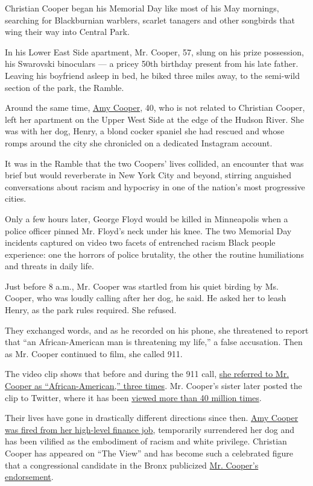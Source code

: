Christian Cooper began his Memorial Day like most of his May mornings,
searching for Blackburnian warblers, scarlet tanagers and other
songbirds that wing their way into Central Park.

In his Lower East Side apartment, Mr. Cooper, 57, slung on his prize
possession, his Swarovski binoculars --- a pricey 50th birthday present
from his late father. Leaving his boyfriend asleep in bed, he biked
three miles away, to the semi-wild section of the park, the Ramble.

Around the same time,
\href{https://www.nytimes3xbfgragh.onion/2020/07/06/nyregion/amy-cooper-false-report-charge.html}{Amy
Cooper}, 40, who is not related to Christian Cooper, left her apartment
on the Upper West Side at the edge of the Hudson River. She was with her
dog, Henry, a blond cocker spaniel she had rescued and whose romps
around the city she chronicled on a dedicated Instagram account.

It was in the Ramble that the two Coopers' lives collided, an encounter
that was brief but would reverberate in New York City and beyond,
stirring anguished conversations about racism and hypocrisy in one of
the nation's most progressive cities.

Only a few hours later, George Floyd would be killed in Minneapolis when
a police officer pinned Mr. Floyd's neck under his knee. The two
Memorial Day incidents captured on video two facets of entrenched racism
Black people experience: one the horrors of police brutality, the other
the routine humiliations and threats in daily life.

Just before 8 a.m., Mr. Cooper was startled from his quiet birding by
Ms. Cooper, who was loudly calling after her dog, he said. He asked her
to leash Henry, as the park rules required. She refused.

They exchanged words, and as he recorded on his phone, she threatened to
report that ``an African-American man is threatening my life,'' a false
accusation. Then as Mr. Cooper continued to film, she called 911.

The video clip shows that before and during the 911 call,
\href{https://www.nytimes3xbfgragh.onion/2020/05/29/nyregion/Amy-Cooper-Central-Park-racism.html}{she
referred to Mr. Cooper as ``African-American,'' three times}. Mr.
Cooper's sister later posted the clip to Twitter, where it has been
\href{https://twitter.com/melodyMcooper/status/1264965252866641920}{viewed
more than 40 million times}.

Their lives have gone in drastically different directions since then.
\href{https://www.nytimes3xbfgragh.onion/2020/05/26/nyregion/amy-cooper-dog-central-park.html}{Amy
Cooper was fired from her high-level finance job}, temporarily
surrendered her dog and has been vilified as the embodiment of racism
and white privilege. Christian Cooper has appeared on ``The View'' and
has become such a celebrated figure that a congressional candidate in
the Bronx publicized
\href{https://www.nydailynews.com/news/politics/ny-chris-cooper-ritchie-torres-endorsement-20200607-3uualrgirrbsfpuvgxhue2pu4u-story.html}{Mr.
Cooper's endorsement}.


